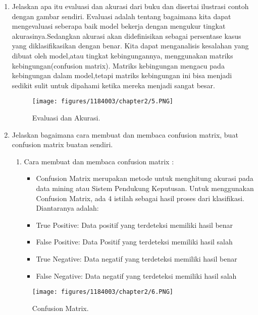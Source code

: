 \begin{enumerate}
	\item Jelaskan apa itu evaluasi dan akurasi dari buku dan disertai ilustrasi contoh dengan gambar sendiri.
	\hfill\break
	Evaluasi adalah tentang bagaimana kita dapat mengevaluasi seberapa baik model bekerja dengan mengukur tingkat akurasinya.Sedangkan akurasi akan didefinisikan sebagai persentase kasus yang diklasifikasikan dengan benar. Kita dapat menganalisis kesalahan yang dibuat oleh model,atau tingkat kebingungannya, menggunakan matriks kebingungan(confusion matrix). Matriks kebingungan mengacu pada kebingungan dalam model,tetapi matriks kebingungan ini bisa menjadi sedikit sulit untuk dipahami ketika mereka menjadi sangat besar.
	\begin{figure}[h]
	\centering
		\texttt{[image: figures/1184003/chapter2/5.PNG]}
		\caption{Evaluasi dan Akurasi.}
	\end{figure}

	\item Jelaskan bagaimana cara membuat dan membaca confusion matrix, buat confusion matrix buatan sendiri.
	\hfill\break
	\begin{enumerate}
	\item Cara membuat dan membaca confusion matrix :
	\begin{itemize}
	\item Confusion Matrix merupakan metode untuk menghitung akurasi pada data mining atau Sistem Pendukung Keputusan. Untuk menggunakan Confusion Matrix, ada 4 istilah sebagai hasil proses dari klasifikasi. Diantaranya adalah:
	\item True Positive: Data positif yang terdeteksi memiliki hasil benar
    \item False Positive: Data Positif yang terdeteksi memiliki hasil salah
    \item True Negative: Data negatif yang terdeteksi memiliki hasil benar
    \item False Negative: Data negatif yang terdeteksi memiliki hasil salah
	\end{itemize}
	\end{enumerate}
	\begin{figure}[h]
	\centering
		\texttt{[image: figures/1184003/chapter2/6.PNG]}
		\caption{Confusion Matrix.}
	\end{figure}


\end{enumerate}
